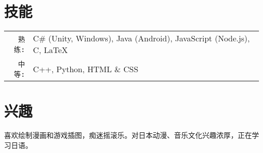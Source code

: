 \documentclass[UTF8]{ctexart}
\begin{document}
\smallskip

\section{技能}
\smallskip
\noindent
\begin{tabularx}{\linewidth}{r X}
\texttt{熟练:} & C\# (Unity, Windows), Java (Android), JavaScript (Node.js), C, \LaTeX \\
\texttt{中等:} & C++, Python, HTML \& CSS
\end{tabularx}

\smallskip

\section{兴趣}
\smallskip
\noindent
喜欢绘制漫画和游戏插图，痴迷摇滚乐。对日本动漫、音乐文化兴趣浓厚，正在学习日语。
\end{document}
